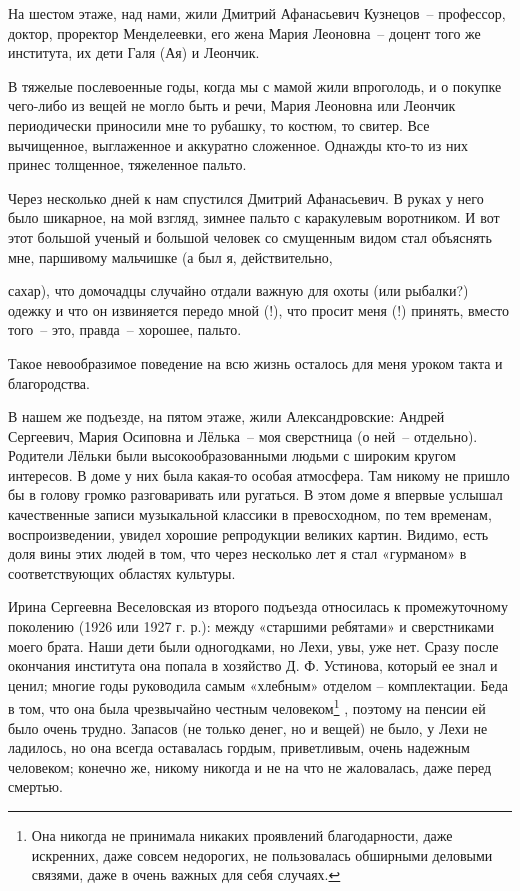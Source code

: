 \newline

На шестом этаже, над нами, жили Дмитрий Афанасьевич Кузнецов~-- профессор, доктор, проректор Менделеевки, его жена Мария Леоновна~-- доцент того же института, их дети Галя (Ая) и Леончик.



В тяжелые послевоенные годы, когда мы с мамой жили впроголодь, и о покупке чего-либо из вещей не могло быть  и  речи,  Мария Леоновна или Леончик периодически приносили мне то рубашку, то костюм, то свитер. Все вычищенное, выглаженное и аккуратно сложенное. Однажды кто-то из них принес толщенное, тяжеленное пальто.

Через несколько дней к нам спустился Дмитрий Афанасьевич. В руках у него было шикарное, на мой взгляд, зимнее пальто с каракулевым воротником. И вот этот большой ученый и большой человек со смущенным видом стал объяснять мне, паршивому мальчишке (а был я, действительно, 




\restoregeometry

 сахар), что домочадцы случайно отдали важную для охоты (или рыбалки?) одежку и что он извиняется передо мной (!), что просит меня (!) принять, вместо того~-- это, правда~-- хорошее, пальто.



Такое невообразимое поведение на всю жизнь осталось для меня уроком такта и благородства.

\newline

В нашем же подъезде, на пятом этаже, жили Александровские: Андрей Сергеевич, Мария Осиповна и Лёлька~-- моя сверстница (о ней~-- отдельно). Родители Лёльки были высокообразованными людьми с широким кругом интересов. В доме у них была какая-то особая атмосфера. Там никому не пришло бы в голову громко разговаривать или ругаться. В этом доме я впервые услышал качественные записи музыкальной классики в превосходном, по тем временам, воспроизведении, увидел хорошие репродукции великих картин. Видимо, есть доля вины этих людей в том, что через несколько лет я стал «гурманом» в соответствующих областях культуры.

\newlin

Ирина Сергеевна Веселовская из второго подъезда относилась к промежуточному поколению (1926 или 1927 г. р.): между «старшими ребятами» и сверстниками моего брата. Наши дети были одногодками, но Лехи, увы, уже нет. Сразу после окончания института она попала в хозяйство Д. Ф. Устинова, который ее знал и ценил; многие годы руководила самым «хлебным» отделом – комплектации. Беда в том, что она была чрезвычайно честным человеком\protect\footnote{Она никогда не принимала никаких проявлений благодарности, даже искренних, даже совсем недорогих, не пользовалась обширными деловыми связями, даже в очень важных для себя случаях.} , поэтому на пенсии ей было очень трудно. Запасов (не только денег, но и вещей) не было, у Лехи не ладилось, но она всегда оставалась гордым, приветливым, очень надежным человеком; конечно же, никому никогда и не на что не жаловалась, даже перед смертью. 

